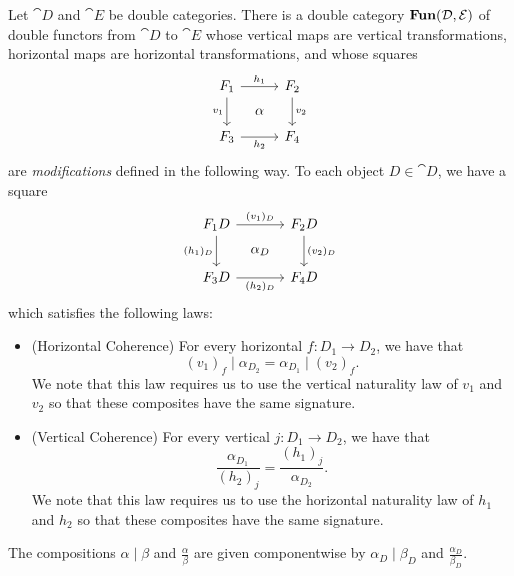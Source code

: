 \documentclass[DynamicalBook]{subfiles}
\begin{document}
\begin{theorem}
Let $\cat{D}$ and $\cat{E}$ be double categories. There is a double category
$\textbf{Fun}(\mathcal{D}, \mathcal{E})$ of double functors from $\cat{D}$ to $\cat{E}$
whose vertical maps are vertical transformations, horizontal maps are horizontal
transformations, and whose squares
\[
        \begin{tikzcd}[sep=tiny]
          F_1 \ar[dd, "v_1"'] \ar[rr, "h_1"] & & F_2
 \ar[dd, "v_2"] \\
           & \alpha & \\
          F_3 \ar[rr, "h_2"'] & & F_4
        \end{tikzcd}
      \]
      are \emph{modifications} defined in the following way. To each object $D
      \in \cat{D}$, we have a square
\[
        \begin{tikzcd}[sep=tiny]
          F_1D \ar[dd, "(h_1)_D"'] \ar[rr, "( v_1 )_D"] & & F_2D
 \ar[dd, "( v_2 )_D"] \\
           & \alpha_D & \\
          F_3 D \ar[rr, "( h_2 )_D"'] & & F_4 D
        \end{tikzcd}
\]
which satisfies the following laws:
\begin{itemize}
  \item (Horizontal Coherence) For every horizontal $f : D_1 \to D_2$, we have
    that
    \[
    (v_1)_f \mid \alpha_{D_2} = \alpha_{D_1} \mid (v_2)_f.
  \]
  We note that this law requires us to use the vertical naturality law of $v_1$
  and $v_2$ so that these composites have the same signature.
  \item (Vertical Coherence) For every vertical $j : D_1 \to D_2$, we have that
    \[
    \frac{\alpha_{D_1}}{(h_2)_j} = \frac{(h_1)_j}{\alpha_{D_2}}.
    \]
  We note that this law requires us to use the horizontal naturality law of $h_1$
  and $h_2$ so that these composites have the same signature.
\end{itemize}
 The compositions $\alpha \mid \beta$ and $\frac{\alpha}{\beta}$ are given
 componentwise by $\alpha_D \mid \beta_D$ and $\frac{\alpha_D}{\beta_D}$.      
\end{theorem}
\end{document}

